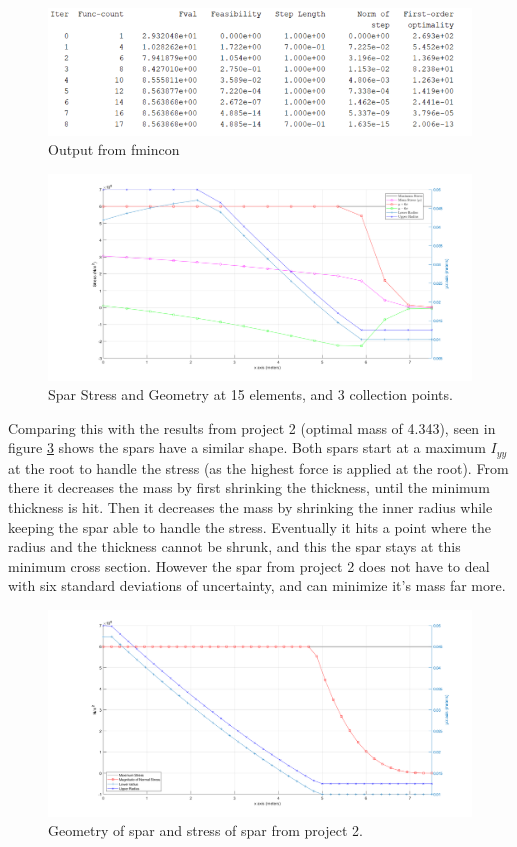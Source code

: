 \documentclass[12pt]{article}
\begin{document}
	\begin{figure}[H]
		\centering
		\includegraphics[width=0.7\linewidth]{FminConOutPut}
		\caption{Output from fmincon}
		\label{fig:fminconoutput}
	\end{figure}
	
	
	\begin{figure}[H]
		\centering
		\includegraphics[width=0.7\linewidth]{codeResultsAll}
		\caption{Spar Stress and Geometry  at 15 elements, and 3 collection points. }
		\label{fig:coderesultsall}
	\end{figure}
	
	

	
	Comparing this with the results from project 2 (optimal mass of 4.343), seen in figure \ref{fig:geovstress} shows the spars have a similar shape. Both spars start at a maximum $I_{yy}$ at the root to handle the stress (as the highest force is applied at the root). From there it decreases the mass by first shrinking the thickness, until the minimum thickness is hit. Then it decreases the mass by shrinking the inner radius while keeping the spar able to handle the stress. Eventually it hits a point where the radius and the thickness cannot be shrunk, and this the spar stays at this minimum cross section. However the spar from project 2 does not have to deal with six standard deviations of uncertainty, and can minimize it's mass far more.
	
	\begin{figure}[H]
		\centering
		\includegraphics[width=0.7\linewidth]{geoVstress}
		\caption{Geometry of spar and stress of spar from project 2.}
		\label{fig:geovstress}
	\end{figure}
	
\end{document}
